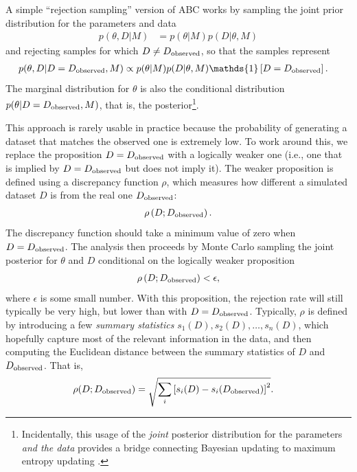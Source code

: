 \documentclass[article]{jss}
\begin{document}
A simple ``rejection sampling'' version of
ABC works by sampling the joint prior distribution for the parameters and
data
\begin{align*}
p(\theta, D | M) &= p(\theta | M)p(D | \theta, M)
\end{align*}
and rejecting samples for which $D \neq D_{\rm observed}$, so that the
samples represent
\begin{align}
p(\theta, D | D = D_{\rm observed}, M) &\propto p(\theta | M)p(D | \theta, M)
\mathds{1}\left[D = D_{\rm observed}\right].\label{eqn:abc_posterior}
\end{align}
The marginal distribution for $\theta$ is also the conditional distribution
$p(\theta | D = D_{\rm observed}, M)$, that is,
the posterior\footnote{Incidentally, this usage of the {\em joint} posterior
distribution for the parameters {\em and the data} provides a bridge
connecting Bayesian updating to maximum entropy updating
\citep{caticha2006updating,giffin2007updating}.}.

This approach is rarely usable in practice because the probability of
generating a dataset that matches the observed one is extremely low.
To work around this, we replace the proposition
$D = D_{\rm observed}$ with a logically
weaker one (i.e., one that is implied by $D = D_{\rm observed}$ but does not
imply it).
The weaker proposition is defined using
a discrepancy function
$\rho$, which measures how different a simulated dataset $D$ is from
the real one $D_{\rm observed}$:
\begin{align*}
\rho\left(D; D_{\rm observed}\right).
\end{align*}
The discrepancy function should take a minimum value of zero when
$D = D_{\rm observed}$.
The analysis then proceeds by Monte Carlo sampling the
joint posterior for $\theta$ and $D$
conditional on the logically weaker proposition
\begin{align*}
\rho\left(D; D_{\rm observed}\right) < \epsilon,
\end{align*}
where $\epsilon$ is some small number. With this proposition, the
rejection rate will still
typically be very high, but lower than with $D = D_{\rm observed}$.
Typically, $\rho$ is defined by introducing a few {\em summary statistics}
$s_1(D), s_2(D), \ldots, s_n(D)$, which hopefully capture most of the relevant
information in the data, and then computing the Euclidean distance
between the summary statistics of $D$ and $D_{\rm observed}$.
That is,
\begin{align*}
\rho(D; D_{\rm observed}) &=
\sqrt{\sum_i \left[s_i(D) - s_i(D_{\rm observed})\right]^2}.
\end{align*}
\end{document}
